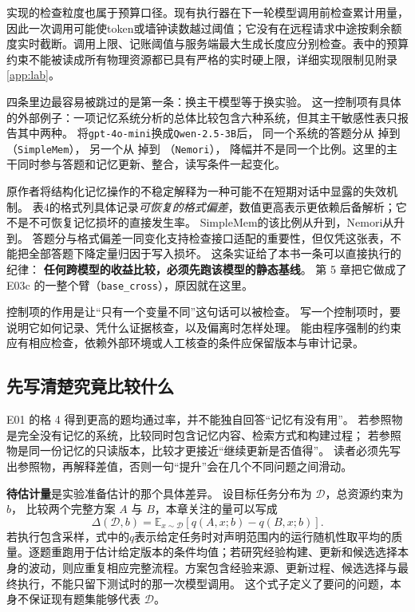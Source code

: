 实现的检查粒度也属于预算口径。现有执行器在下一轮模型调用前检查累计用量，因此一次调用可能使token或墙钟读数越过阈值；它没有在远程请求中途按剩余额度实时截断。调用上限、记账阈值与服务端最大生成长度应分别检查。表中的预算约束不能被读成所有物理资源都已具有严格的实时硬上限，详细实现限制见附录\ref{app:lab}。


\begin{sloppypar}
四条里边最容易被跳过的是第一条：换主干模型等于换实验。
这一控制项有具体的外部例子：一项记忆系统分析的总体比较包含六种系统，但其主干敏感性表只报告其中两种\cite{anatomy-memory-2602}。
将\texttt{gpt-4o-mini}换成\texttt{Qwen-2.5-3B}后，
同一个系统的答题分从  掉到 （\texttt{SimpleMem}），
另一个从  掉到 （\texttt{Nemori}），
降幅并不是同一个比例。这里的主干同时参与答题和记忆更新、整合，读写条件一起变化。
\end{sloppypar}

\begin{sloppypar}
原作者将结构化记忆操作的不稳定解释为一种可能不在短期对话中显露的失效机制。
表4的格式列具体记录\emph{可恢复的格式偏差}，数值更高表示更依赖后备解析；它不是不可恢复记忆损坏的直接发生率。
SimpleMem的该比例从升到，Nemori从升到。
答题分与格式偏差一同变化支持检查接口适配的重要性，但仅凭这张表，不能把全部答题下降定量归因于写入损坏。
这条实证给了本书一条可以直接执行的纪律：
\textbf{任何跨模型的收益比较，必须先跑该模型的静态基线}。
第 5 章把它做成了 E03c 的一整个臂（\texttt{base\_cross}），原因就在这里。
\end{sloppypar}

\begin{principlebox}
控制项的作用是让“只有一个变量不同”这句话可以被检查。
写一个控制项时，要说明它如何记录、凭什么证据核查，以及偏离时怎样处理。
能由程序强制的约束应有相应检查，依赖外部环境或人工核查的条件应保留版本与审计记录。
\end{principlebox}

\subsection{先写清楚究竟比较什么}

E01 的格 4 得到更高的题均通过率，并不能独自回答“记忆有没有用”。
若参照物是完全没有记忆的系统，比较同时包含记忆内容、检索方式和构建过程；
若参照物是同一份记忆的只读版本，比较才更接近“继续更新是否值得”。
读者必须先写出参照物，再解释差值，否则一句“提升”会在几个不同问题之间滑动。

\textbf{待估计量}是实验准备估计的那个具体差异。
设目标任务分布为 $\mathcal D$，总资源约束为 $b$，
比较两个完整方案 $A$ 与 $B$，本章关注的量可以写成
\begin{equation}
  \Delta(\mathcal D,b)
  =\mathbb E_{x\sim\mathcal D}\left[q(A,x;b)-q(B,x;b)\right].
  \label{eq:ch03-estimand}
\end{equation}
若执行包含采样，式中的$q$表示给定任务时对声明范围内的运行随机性取平均的质量。逐题重跑用于估计给定版本的条件均值；若研究经验构建、更新和候选选择本身的波动，则应重复相应完整流程。方案包含经验来源、更新过程、候选选择与最终执行，不能只留下测试时的那一次模型调用。
这个式子定义了要问的问题，本身不保证现有题集能够代表 $\mathcal D$。

